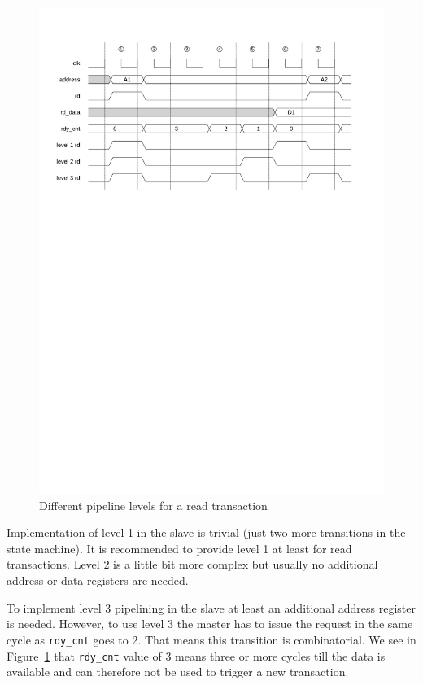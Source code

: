 \documentclass[a4paper,12pt]{scrartcl}
\newcommand{\sign}[1]{{\texttt{#1}}}
\begin{document}
\begin{figure}
    \centering
    \includegraphics[width=\textwidth]{figures/sc_pipe_level}
    \caption{Different pipeline levels for a read transaction}
    \label{fig:sc:pipe:level}
\end{figure}

Implementation of level 1 in the slave is trivial (just two more
transitions in the state machine). It is recommended to provide
level 1 at least for read transactions. Level 2 is a little bit more
complex but usually no additional address or data registers are
needed.

To implement level 3 pipelining in the slave at least an additional
address register is needed. However, to use level 3 the master has
to issue the request in the same cycle as \sign{rdy\_cnt} goes to 2.
That means this transition is combinatorial. We see in
Figure~\ref{fig:sc:pipe:level} that \sign{rdy\_cnt} value of 3 means
three or more cycles till the data is available and can therefore
not be used to trigger a new transaction.
\end{document}
